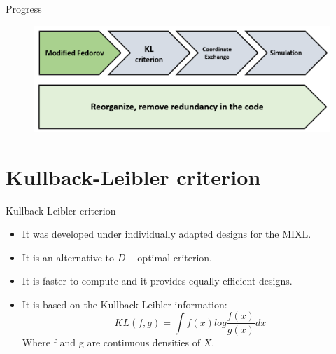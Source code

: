 \documentclass[11pt,t]{beamer}
\begin{document}
\begin{frame}[c]{Progress}
	\begin{figure}
		\centering
		\includegraphics[scale = .6]{mygraphics/Objectives_modfed.png}
	\end{figure}
\end{frame}

\section{Kullback-Leibler criterion}

\begin{frame}[fragile]{Kullback-Leibler criterion}
	\begin{itemize}
		\item It was developed under individually adapted designs for the MIXL.
		\item It is an alternative to $D-$optimal criterion.
		\item It is faster to compute and it provides equally efficient designs.
		\item It is based on the Kullback-Leibler information:
		$$KL(f,g) = \int f(x) log \frac{f(x)}{g(x)}dx$$
		Where f and g are continuous densities of $X$.
	\end{itemize}
\end{frame}
\end{document}
